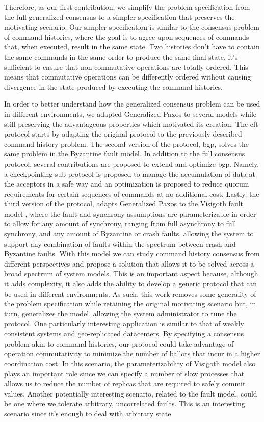 \iffalse
Therefore, as our first contribution, we simplify the problem specification from the full generalized consensus to a simpler specification that preserves the motivating scenario. Our simpler specification is similar to the consensus problem of command histories, where the goal is to agree upon sequences of commands that, when executed, result in the same state. Two histories don't have to contain the same commands in the same order to produce the same final state, it's sufficient to ensure that non-commutative operations are totally ordered. This means that commutative operations can be differently ordered without causing divergence in the state produced by executing the command histories. \par
In order to better understand how the generalized consensus problem can be used in different environments, we adapted Generalized Paxos to several models while still preserving the advantageous properties which motivated its creation. The \acrfull{cft} protocol starts by adapting the original protocol to the previously described command history problem. The second version of the protocol, \acrfull{bgp}, solves the same problem in the Byzantine fault model. In addition to the full consensus protocol, several contributions are proposed to extend and optimize \acrshort{bgp}. Namely, a checkpointing sub-protocol is proposed to manage the accumulation of data at the acceptors in a safe way and an optimization is proposed to reduce quorum requirements for certain sequences of commands at no additional cost. Lastly, the third version of the protocol, adapts Generalized Paxos to the Visigoth fault model \cite{Porto2015}, where the fault and synchrony assumptions are parameterizable in order to allow for any amount of synchrony, ranging from full asynchrony to full synchrony, and any amount of Byzantine or crash faults, allowing the system to support any combination of faults within the spectrum between crash and Byzantine faults. With this model we can study command history consensus from different perspectives and propose a solution that allows it to be solved across a broad spectrum of system models. This is an important aspect because, although it adds complexity, it also adds the ability to develop a generic protocol that can be used in different environments. As such, this work removes some generality of the problem specification while retaining the original motivating scenario but, in turn, generalizes the model, allowing the system administrator to tune the protocol.  One particularly interesting application is similar to that of weakly consistent systems and geo-replicated datacenters. By specifying a consensus problem akin to command histories, our protocol could take advantage of operation commutativity to minimize the number of ballots that incur in a higher coordination cost. In this scenario, the parameterizability of Visigoth model also plays an important role since we can specify a number of slow processes that allows us to reduce the number of replicas that are required to safely commit values. Another potentially interesting scenario, related to the fault model, could be one where we tolerate arbitrary, uncorrelated faults. This is an interesting scenario since it's enough to deal with arbitrary state 